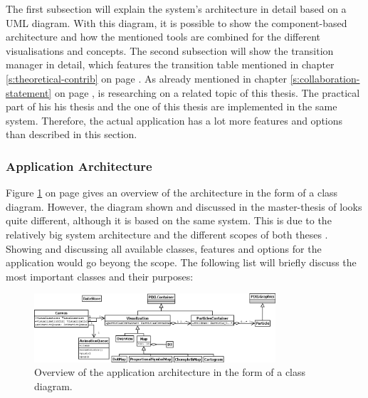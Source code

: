 The first subsection will explain the system's architecture in detail based on a \ac{UML} diagram. With this diagram, it is possible to show the component-based architecture and how the mentioned tools are combined for the different visualisations and concepts. The second subsection will show the transition manager in detail, which features the transition table mentioned in chapter \ref{s:theoretical-contrib} on page \pageref{s:theoretical-contrib}.
As already mentioned in chapter \ref{s:collaboration-statement} on page \pageref{s:collaboration-statement}, \citeauthor{Wanko2016} is researching on a related topic of this thesis. The practical part of his his thesis and the one of this thesis are implemented in the same system. Therefore, the actual application has a lot more features and options than described in this section.

\subsubsection{Application Architecture}
Figure \ref{fig:uml-practical-approach} on page \pageref{fig:uml-practical-approach} gives an overview of the architecture in the form of a class diagram. However, the diagram shown and discussed in the master-thesis of \citeauthor{Wanko2016} looks quite different, although it is based on the same system. This is due to the relatively big system architecture and the different scopes of both theses . Showing and discussing all available classes, features and options for the application would go beyong the scope. The following list will briefly discuss the most important classes and their purposes:

\begin{figure}[!htb]
\centering
\includegraphics[width=0.8\textwidth,keepaspectratio]{images/results/dia.png}
\caption[
    Overview of the application architecture in the form of a class diagram.
]{Overview of the application architecture in the form of a class diagram.}
\label{fig:uml-practical-approach}
\end{figure}


